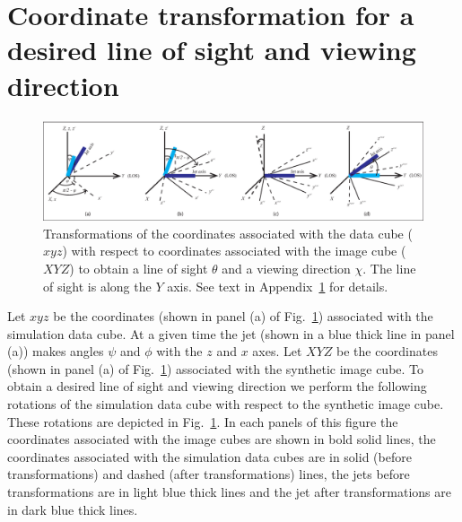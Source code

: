 \documentclass[useAMS, usenatbib]{mn2e}
\begin{document}
\section{Coordinate transformation for a desired line of sight and viewing direction}\label{A:trans}
\begin{figure}
\centering
\includegraphics[width=\textwidth]{fig9.eps}
\caption{Transformations of the coordinates associated with the data cube ($xyz$) with respect to coordinates associated with the image cube ($XYZ$) to obtain a line of sight $\theta$ and a viewing direction $\chi$. The line of sight is along the $Y$ axis. See text in Appendix~\ref{A:trans} for details.  }
\label{f:rot}
\end{figure}
Let $xyz$ be the coordinates (shown in panel (a) of Fig.~\ref{f:rot}) associated with the simulation data cube. At a given time the jet (shown in a blue thick line in panel (a)) makes angles $\psi$ and $\phi$ with the $z$ and $x$ axes. Let $XYZ$ be the coordinates (shown in panel (a) of Fig.~\ref{f:rot}) associated with the synthetic image cube. 
To obtain a desired line of sight and viewing direction we perform the following rotations of the simulation data cube with respect to the synthetic image cube. These rotations are depicted in Fig.~\ref{f:rot}. In each panels of this figure the coordinates associated with the image cubes are shown in bold solid lines, the coordinates associated with the simulation data cubes are in solid (before transformations) and dashed (after transformations) lines, the jets before transformations are in light blue thick lines and the jet after transformations are in dark blue thick lines. 
\end{document}
